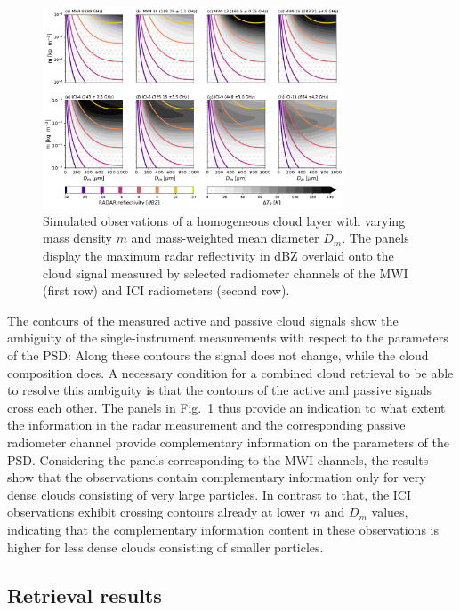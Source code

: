 \documentclass[journal abbreviation, manuscript]{copernicus}
\begin{document}
\begin{figure}
\centering
\includegraphics[width = 0.8\textwidth]{../plots/contours}
\caption{Simulated observations of a homogeneous cloud layer with
varying mass density $m$ and mass-weighted mean diameter $D_m$. The panels
display the maximum radar reflectivity in dBZ  overlaid onto the
cloud signal measured by selected radiometer channels of the MWI
(first row) and  ICI radiometers (second row).}
\label{fig:contours}
\end{figure}

The contours of the measured active and passive cloud signals show the ambiguity
of the single-instrument measurements with respect to the parameters of the PSD:
Along these contours the signal does not change, while the cloud composition
does. A necessary condition for a combined cloud retrieval to be able to resolve
this ambiguity is that the contours of the active and passive signals cross each
other. The panels in Fig.~\ref{fig:contours} thus provide an indication to what
extent the information in the radar measurement and the corresponding passive
radiometer channel provide complementary information on the parameters of the
PSD. Considering the panels corresponding to the MWI channels, the results show
that the observations contain complementary information only for very dense
clouds consisting of very large particles. In contrast to that, the ICI
observations exhibit crossing contours already at lower $m$ and $D_m$ values,
indicating that the complementary information content in these observations is
higher for less dense clouds consisting of smaller particles.

\subsection{Retrieval results}
\end{document}
